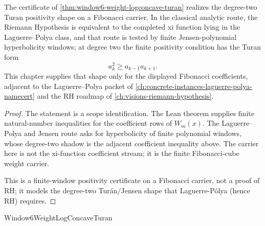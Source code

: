 \begin{theorem}
\label{thm:window6-weight-logconcave-rh-shape}
The certificate of \autoref{thm:window6-weight-logconcave-turan} realizes the degree-two Turan positivity shape on a Fibonacci carrier. In the classical analytic route, the Riemann Hypothesis is equivalent to the completed xi function lying in the Laguerre--Polya class, and that route is tested by finite Jensen-polynomial hyperbolicity windows; at degree two the finite positivity condition has the Turan form
$$
a_k^2\geq a_{k-1}a_{k+1}.
$$
This chapter supplies that shape only for the displayed Fibonacci coefficients, adjacent to the Laguerre--Polya packet of \autoref{ch:concrete-instances-laguerre-polya-namecert} and the RH roadmap of \autoref{ch:visions-riemann-hypothesis}.
\end{theorem}
\begin{proof}
The statement is a scope identification. The Lean theorem supplies finite natural-number inequalities for the coefficient rows of $W_m(x)$. The Laguerre--Polya and Jensen route asks for hyperbolicity of finite polynomial windows, whose degree-two shadow is the adjacent coefficient inequality above. The carrier here is not the xi-function coefficient stream; it is the finite Fibonacci-cube weight carrier.

This is a finite-window positivity certificate on a Fibonacci carrier, not a proof of RH; it models the degree-two Turán/Jensen shape that Laguerre-Pólya (hence RH) requires.
\end{proof}




\begin{closurestatus}{Window6WeightLogConcaveTuran}
  \theoryclosure{\scopedClosure}
  \formalstatus{\theoremCheckedV}
\end{closurestatus}
